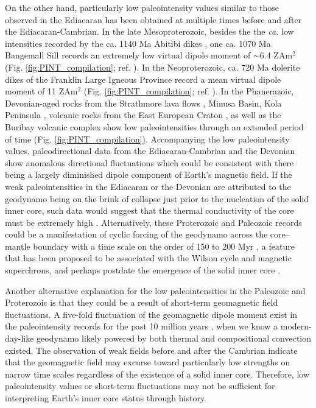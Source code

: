 \documentclass[9pt,twocolumn,twoside,lineno]{pnas-new}
\begin{document}
On the other hand, particularly low paleointensity values similar to those observed in the Ediacaran has been obtained at multiple times before and after the Ediacaran-Cambrian. In the late Mesoproterozoic, besides the the \textit{ca.} low intensities recorded by the ca. 1140 Ma Abitibi dikes \cite{Macouin2003a}, one ca. 1070 Ma Bangemall Sill records an extremely low virtual dipole moment of $\sim$6.4 ZAm$^2$ (Fig. \ref{fig:PINT_compilation}; ref. \citealp{Lloyd2021b}). In the Neoproterozoic, ca. 720 Ma dolerite dikes of the Franklin Large Igneous Province record a mean virtual dipole moment of 11 ZAm$^2$ (Fig. \ref{fig:PINT_compilation}; ref. \citealp{Lloyd2021a}). In the Phanerazoic, Devonian-aged rocks from the Strathmore lava flows \cite{Hawkins2021a}, Minusa Basin, Kola Peninsula \cite{Shcherbakova2017a}, volcanic rocks from the East European Craton \cite{Shcherbakova2019a}, as well as the Buribay volcanic complex \cite{Shcherbakova2021a} show low paleointensities through an extended period of time (Fig. \ref{fig:PINT_compilation}). Accompanying the low paleointensity values, paleodirectional data from the Ediacaran-Cambrian \cite{Bono2015a, Halls2015b, Kodama2021a} and the Devonian show anomalous directional fluctuations \cite{Shcherbakova2019a} which could be consistent with there being a largely diminished dipole component of Earth's magnetic field. If the weak paleointensities in the Ediacaran or the Devonian are attributed to the geodynamo being on the brink of collapse just prior to the nucleation of the solid inner core, such data would suggest that the thermal conductivity of the core must be extremely high \cite{Davies2015a, Ohta2016a}. Alternatively, these Proterozoic and Paleozoic records could be a manifestation of cyclic forcing of the geodynamo across the core–mantle boundary with a time scale on the order of 150 to 200 Myr \cite{Courtillot1987a, Hawkins2021a}, a feature that has been proposed to be associated with the Wilson cycle and magnetic superchrons, and perhaps postdate the emergence of the solid inner core \cite{Courtillot1987a, Courtillot2007a}. 

Another alternative explanation for the low paleointensities in the Paleozoic and Proterozoic is that they could be a result of short-term geomagnetic field fluctuations. A five-fold fluctuation of the geomagnetic dipole moment exist in the paleointensity records for the past 10 million years \cite{Bono2021a}, when we know a modern-day-like geodynamo likely powered by both thermal and compositional convection existed. The observation of weak fields before and after the Cambrian indicate that the geomagnetic field may excurse toward particularly low strengths on narrow time scales regardless of the existence of a solid inner core. Therefore, low paleointensity values or short-term fluctuations may not be sufficient for interpreting Earth's inner core status through history.
\end{document}
